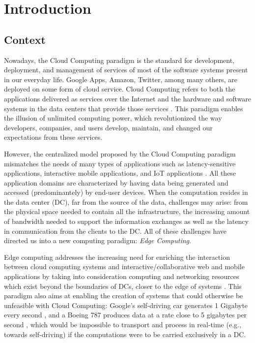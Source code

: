 


\chapter{Introduction}
\label{cha:introduction}



\section{Context} \label{sec:context}

Nowadays, the Cloud Computing paradigm is the standard for development, deployment, and management of services of most of the software systems present in our everyday life. Google Apps, Amazon, Twitter, among many others, are deployed on some form of cloud service. Cloud Computing refers to both the applications delivered as services over the Internet and the hardware and software systems in the data centers that provide those services \cite{10.1145/1721654.1721672}. This paradigm enables the illusion of unlimited computing power, which revolutionized the way developers, companies, and users develop, maintain, and changed our expectations from these services.

However, the centralized model proposed by the Cloud Computing paradigm mismatches the needs of many types of applications such as latency-sensitive applications, interactive mobile applications, and IoT applications \cite{10.1145/3154815}. All these application domains are characterized by having data being generated and accessed (predominantely) by end-user devices. When the computation resides in the data center (DC), far from the source of the data, challenges may arise: from the physical space needed to contain all the infrastructure, the increasing amount of bandwidth needed to support the information exchanges as well as the latency in communication from the clients to the DC. All of these challenges have directed us into a new computing paradigm: \textit{Edge Computing}.

Edge computing addresses the increasing need for enriching the interaction between cloud computing systems and interactive/collaborative web and mobile applications \cite{10.1145/242857.242867} by taking into consideration computing and networking resources which exist beyond the boundaries of DCs, closer to the edge of systems \cite{Leitao2018} \cite{7488250}. This paradigm also aims at enabling the creation of systems that could otherwise be unfeasible with Cloud Computing: Google's self-driving car generates 1 Gigabyte every second \cite{datafloq}, and a Boeing 787 produces data at a rate close to 5 gigabytes per second \cite{finnegan_2013}, which would be impossible to transport and process in real-time (e.g., towards self-driving) if the computations were to be carried exclusively in a DC.

